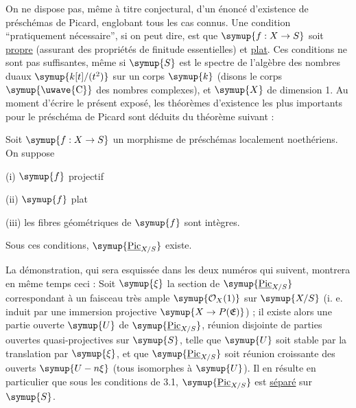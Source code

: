 
On ne dispose pas, même à titre conjectural, d'un énoncé d'existence de
préschémas de Picard, englobant tous les cas connus. Une condition ``pratiquement
nécessaire'', si on peut dire, est que $\symup{f:X\to S}$ soit \uline{propre}
(assurant des propriétés de finitude essentielles) et \uline{plat}. Ces conditions ne
sont pas suffisantes, même si $\symup{S}$ est le spectre de l'algèbre des nombres duaux
$\symup{k[t]/(t^2)}$ sur un corps $\symup{k}$ (disons le corps $\symup{\text{\uwave{C}}}$ des nombres
complexes), et $\symup{X}$ de dimension 1. Au moment d'écrire le présent exposé, les
théorèmes d'existence les plus importants pour le préschéma de Picard sont
déduits du théorème suivant :

 Soit $\symup{f:X\to S}$ un morphisme de préschémas
localement noethériens. On suppose

\noindent (i) $\symup{f}$ projectif

\noindent (ii) $\symup{f}$ plat

\noindent (iii) les fibres géométriques de $\symup{f}$ sont intègres.

Sous ces conditions, $\symup{\underline{\operatorname{Pic}}_{X/S}}$ existe.

La démonstration, qui sera esquissée dans les deux numéros qui suivent,
montrera en même temps ceci : Soit $\symup{\xi}$ la section de
$\symup{\underline{\operatorname{Pic}}_{X/S}}$ correspondant à un faisceau très ample
$\symup{\mathcal O_X(1)}$ sur $\symup{X/S}$ (i. e. induit par une immersion projective
$\symup{X\to P(\mathfrak E)}$) ; il existe alors une partie ouverte
$\symup{U}$ de $\symup{\underline{\operatorname{Pic}}_{X/S}}$, réunion disjointe de parties ouvertes
quasi-projectives sur $\symup{S}$, telle que $\symup{U}$ soit stable par la translation par
$\symup{\xi}$, et que $\symup{\underline{\operatorname{Pic}}_{X/S}}$ soit réunion croissante des ouverts
$\symup{U-n\xi}$ (tous isomorphes à $\symup{U}$). Il en résulte en particulier que sous les
conditions de 3.1, $\symup{\underline{\operatorname{Pic}}_{X/S}}$ est \uline{séparé} sur $\symup{S}$.

